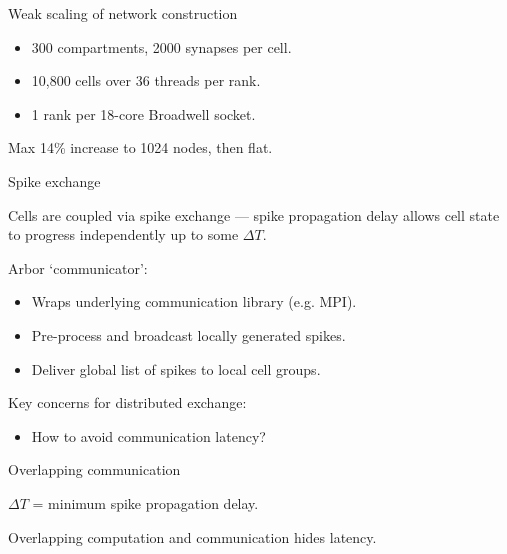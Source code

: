 \documentclass[aspectratio=43]{beamer}
\newcommand{\arbor}{{\ttfamily Arbor}\xspace}
\begin{document}
\begin{frame}[fragile]{Weak scaling of network construction}
    \begin{itemize}
        \item 300 compartments, 2000 synapses per cell.
        \item 10,800 cells over 36 threads per rank.
        \item 1 rank per 18-core Broadwell socket.
    \end{itemize}
    
    \begin{center}
        
        \label{fig:weak_net}
    \end{center}
    
    \centering
    Max 14\% increase to 1024 nodes, then flat.
\end{frame}

\begin{frame}[fragile]{Spike exchange}
    \vfill

    Cells are coupled via spike exchange --- spike propagation delay allows
    cell state to progress independently up to some $\Delta T$.
    \vfill
    
    \arbor{} `communicator':
    \begin{itemize}
        \item Wraps underlying communication library (e.g. MPI).
        \item Pre-process and broadcast locally generated spikes.
        \item Deliver global list of spikes to local cell groups.
    \end{itemize}
    \vfill
    
    Key concerns for distributed exchange:
    \begin{itemize}
        \item How to avoid communication latency?
    \end{itemize}
    \vfill
\end{frame}

\begin{frame}[fragile]{Overlapping communication}

\centering
$\Delta T$ = minimum spike propagation delay.

\begin{center}
    
    \label{fig:overlap}
\end{center}

Overlapping computation and communication hides latency.\\
\end{frame}
\end{document}
